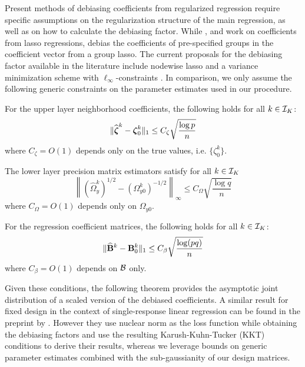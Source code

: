 Present methods of debiasing coefficients from regularized regression require specific assumptions on the regularization structure of the main regression, as well as on how to calculate the debiasing factor. While \cite{ZhangZhang14}, \cite{JavanmardMontanari14} and \cite{vanDeGeerEtal14} work on coefficients from lasso regressions, \cite{MitraZhang16} debias the coefficients of pre-specified groups in the coefficient vector from a group lasso. The current proposals for the debiasing factor available in the literature include nodewise lasso \citep{ZhangZhang14} and a variance minimization scheme with $\ell_\infty$-constraints \citep{JavanmardMontanari14}. In comparison, we only assume the following generic constraints on the parameter estimates used in our procedure.

\vspace{1em}
 For the upper layer neighborhood coefficients, the following holds for all $k \in {\cal{I}}_K$:
%
$$
\| \widehat {{\boldsymbol{\zeta}}}^k - {\boldsymbol{\zeta}}_0^k \|_1 \leq C_\zeta \sqrt { \frac{\log p}{n}}
$$
%
where $C_\zeta = O(1)$ depends only on the true values, i.e. $\{ \zeta^k_0 \}$.

 The lower layer precision matrix estimators satisfy for all $k \in {\cal{I}}_K$
%
$$
\left\| (\widehat \Omega_y^k)^{1/2} - (\Omega_{y0}^k)^{-1/2} \right\|_\infty \leq C_\Omega \sqrt { \frac{\log q}{n}}
$$
%
where $C_\Omega = O(1)$ depends only on $\Omega_{y 0}$.

 For the regression coefficient matrices, the following holds for all $k \in {\cal{I}}_K$:
%
$$
\| \widehat {{\mathbf{B}}}^k - {\mathbf{B}}^k_0 \|_1 \leq C_\beta \sqrt { \frac{\log (p q)}{n}}
$$
%
where $C_\beta = O(1)$ depends on ${\cal{B}}$ only.
\vspace{1em}

Given these conditions, the following theorem provides the asymptotic joint distribution of a scaled version of the debiased coefficients. A similar result for fixed design in the context of single-response linear regression can be found in the preprint by \cite{StuckyVandeGeer17}. However they use nuclear norm as the loss function while obtaining the debiasing factors and use the resulting Karush-Kuhn-Tucker (KKT) conditions to derive their results, whereas we leverage bounds on generic parameter estimates combined with the sub-gaussianity of our design matrices.

